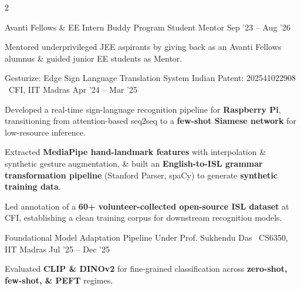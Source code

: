 \documentclass{resume}
\begin{document}
\begin{paracol}{2}

\resumeExperience
{Avanti Fellows \& EE Intern Buddy Program}
{\textcolor{subheadingblue}{Student Mentor}}
{Sep '23 -- Aug '26}
{
\begin{resumeItemize}
\item Mentored underprivileged JEE aspirants by giving back as an Avanti Fellows alumnus \& guided junior EE students as Mentor.
\end{resumeItemize}
}

\switchcolumn



\resumeProject
{Gesturize: Edge Sign Language Translation System}
{Indian Patent: 202541022908 \textbar\ CFI, IIT Madras}
{Apr '24 -- Mar '25}
{
\begin{resumeItemize}

\item Developed a real-time sign-language recognition pipeline for \textbf{Raspberry Pi}, transitioning from attention-based seq2seq to a \textbf{few-shot Siamese network} for low-resource inference.

\item Extracted \textbf{MediaPipe hand-landmark features} with interpolation \& synthetic gesture augmentation, \& built an \textbf{English-to-ISL grammar transformation pipeline} (Stanford Parser, spaCy) to generate \textbf{synthetic training data}.

\item Led annotation of a \textbf{60+ volunteer-collected open-source ISL dataset} at CFI, establishing a clean training corpus for downstream recognition models.

\end{resumeItemize}
}
{}



\resumeProject
{Foundational Model Adaptation Pipeline
\href{https://hemanthdatta.github.io/tpa-17-blog/}{\small\faFile}}
{Under Prof. Sukhendu Das \textbar\ CS6350, IIT Madras}
{Jul '25 -- Dec '25}
{
\begin{resumeItemize}

\item Evaluated
\textbf{CLIP \& DINOv2}
for fine-grained classification across
\textbf{zero-shot, few-shot, \& PEFT}
regimes.


\end{resumeItemize}}
\end{paracol}
\end{document}
